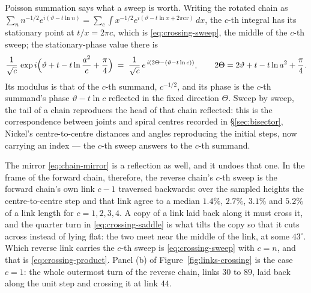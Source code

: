 \documentclass[11pt]{article}
\theoremstyle{definition}
\begin{document}
Poisson summation says what a sweep is worth. Writing the rotated chain as
$\sum_{n}n^{-1/2}e^{i(\vartheta-t\ln n)}
=\sum_{c}\int x^{-1/2}e^{i(\vartheta-t\ln x+2\pi cx)}\,dx$, the $c$-th integral
has its stationary point at $t/x=2\pi c$, which is \eqref{eq:crossing-sweep},
the middle of the $c$-th sweep; the stationary-phase value there is
\begin{equation}\label{eq:crossing-saddle}
\frac{1}{\sqrt c}\,
\exp i\Bigl(\vartheta+t-t\ln\frac{a^{2}}{c}+\frac\pi4\Bigr)
\;=\;\frac{1}{\sqrt c}\,e^{\,i\left(2\Theta-(\vartheta-t\ln c)\right)},
\qquad
2\Theta=2\vartheta+t-t\ln a^{2}+\frac\pi4 .
\end{equation}
Its modulus is that of the $c$-th summand, $c^{-1/2}$, and its phase is the
$c$-th summand's phase $\vartheta-t\ln c$ reflected in the fixed direction
$\Theta$. Sweep by sweep, the tail of a chain reproduces the head of that chain
reflected: this is the correspondence between joints and spiral centres
recorded in \S\ref{sec:bisector}, Nickel's centre-to-centre distances and
angles reproducing the initial steps, now carrying an index — the $c$-th sweep
answers to the $c$-th summand.

The mirror \eqref{eq:chain-mirror} is a reflection as well, and it undoes that
one. In the frame of the forward chain, therefore, the reverse chain's $c$-th
sweep is the forward chain's own link $c-1$ traversed backwards: over the
sampled heights the centre-to-centre step and that link agree to a median
$1.4\%$, $2.7\%$, $3.1\%$ and $5.2\%$ of a link length for $c=1,2,3,4$. A copy
of a link laid back along it must cross it, and the quarter turn in
\eqref{eq:crossing-saddle} is what tilts the copy so that it cuts across
instead of lying flat: the two meet near the middle of the link, at some
$43^{\circ}$. Which reverse link carries the $c$-th sweep is
\eqref{eq:crossing-sweep} with $c=n$, and that is
\eqref{eq:crossing-product}. Panel (b) of Figure~\ref{fig:links-crossing} is
the case $c=1$: the whole outermost turn of the reverse chain, links $30$ to
$89$, laid back along the unit step and crossing it at link $44$.
\end{document}

